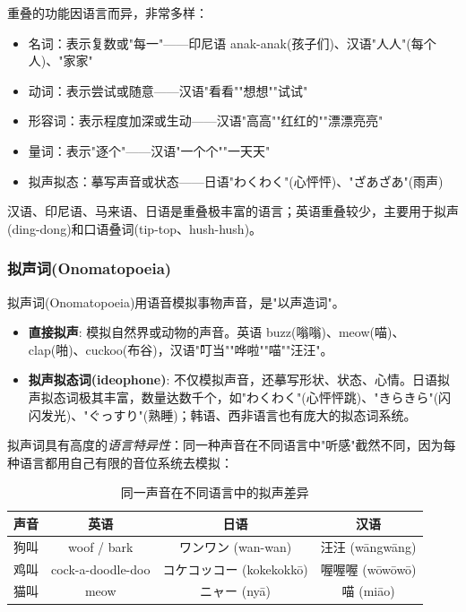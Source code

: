重叠的功能因语言而异，非常多样：
\begin{itemize}
    \item 名词：表示复数或"每一"——印尼语 anak-anak(孩子们)、汉语"人人"(每个人)、"家家"
    \item 动词：表示尝试或随意——汉语"看看""想想""试试"
    \item 形容词：表示程度加深或生动——汉语"高高""红红的""漂漂亮亮"
    \item 量词：表示"逐个"——汉语"一个个""一天天"
    \item 拟声拟态：摹写声音或状态——日语"わくわく"(心怦怦)、"ざあざあ"(雨声)
\end{itemize}

汉语、印尼语、马来语、日语是重叠极丰富的语言；英语重叠较少，主要用于拟声(ding-dong)和口语叠词(tip-top、hush-hush)。

\subsubsection{拟声词(Onomatopoeia)}

拟声词(Onomatopoeia)用语音模拟事物声音，是"以声造词"。

\begin{itemize}
    \item \textbf{直接拟声}: 模拟自然界或动物的声音。英语 buzz(嗡嗡)、meow(喵)、clap(啪)、cuckoo(布谷)，汉语"叮当""哗啦""喵""汪汪"。
    \item \textbf{拟声拟态词(ideophone)}: 不仅模拟声音，还摹写形状、状态、心情。日语拟声拟态词极其丰富，数量达数千个，如"わくわく"(心怦怦跳)、"きらきら"(闪闪发光)、"ぐっすり"(熟睡)；韩语、西非语言也有庞大的拟态词系统。
\end{itemize}

拟声词具有高度的\emph{语言特异性}：同一种声音在不同语言中"听感"截然不同，因为每种语言都用自己有限的音位系统去模拟：

\begin{table}[H]
\centering
\caption{同一声音在不同语言中的拟声差异}
\begin{tabulary}{\textwidth}{@{}CCCC@{}}
\toprule
\textbf{声音} & \textbf{英语} & \textbf{日语} & \textbf{汉语} \\
\midrule
狗叫 & woof / bark & ワンワン (wan-wan) & 汪汪 (wāngwāng) \\
鸡叫 & cock-a-doodle-doo & コケコッコー (kokekokkō) & 喔喔喔 (wōwōwō) \\
猫叫 & meow & ニャー (nyā) & 喵 (miāo) \\
\bottomrule
\end{tabulary}
\end{table}

